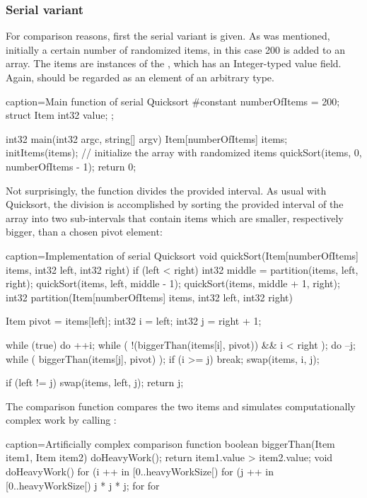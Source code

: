 \subsubsection{Serial variant}
For comparison reasons, first the serial variant is given. As was mentioned, initially a certain number of randomized items, in this case 200 is added to an array. The items are instances of the , which has an Integer-typed value field. Again,  should be regarded as an element of an arbitrary type.
\begin{ccode}{caption=Main function of serial Quicksort}
#constant numberOfItems = 200;
struct Item { int32 value; }; 
 
int32 main(int32 argc, string[] argv) { 
  Item[numberOfItems] items; 
  initItems(items);                        // initialize the array with randomized items
  quickSort(items, 0, numberOfItems - 1);
  return 0; 
}
\end{ccode}
Not surprisingly, the  function divides the provided interval. As usual with Quicksort, the division is accomplished by sorting the provided interval of the array into two sub-intervals that contain items which are smaller, respectively bigger, than a chosen pivot element:
\begin{ccode}{caption=Implementation of serial Quicksort}
void quickSort(Item[numberOfItems] items, int32 left, int32 right) { 
  if (left < right) { 
    int32 middle = partition(items, left, right); 
    quickSort(items, left, middle - 1); 
    quickSort(items, middle + 1, right); 
  }
}
int32 partition(Item[numberOfItems] items, int32 left, int32 right) { 
  Item pivot = items[left]; 
  int32 i = left; 
  int32 j = right + 1; 
   
  while (true) { 
    do { ++i; } while ( !(biggerThan(items[i], pivot)) && i < right ); 
    do { --j; } while ( biggerThan(items[j], pivot) ); 
    if (i >= j) { break; }
    swap(items, i, j); 
  }
   
  if (left != j) { swap(items, left, j); }
  return j; 
}
\end{ccode}
The comparison function  compares the two items and simulates computationally complex work by calling :
\begin{ccode}{caption=Artificially complex comparison function}
boolean biggerThan(Item item1, Item item2) { 
  doHeavyWork(); 
  return item1.value > item2.value; 
}
void doHeavyWork() { 
  for (i ++ in [0..heavyWorkSize[) { 
    for (j ++ in [0..heavyWorkSize[) { 
      j * j * j; 
    } for 
  } for 
}
\end{ccode}

